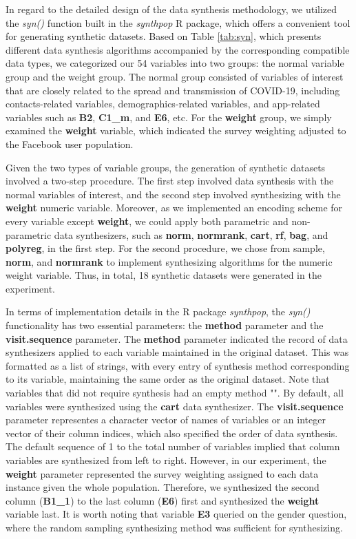 In regard to the detailed design of the data synthesis methodology, we utilized the \textit{syn()} function built in the \textit{synthpop} R package, which offers a convenient tool for generating synthetic datasets. Based on Table \ref{tab:syn}, which presents different data synthesis algorithms accompanied by the corresponding compatible data types, we categorized our 54 variables into two groups: the normal variable group and the weight group. The normal group consisted of variables of interest that are closely related to the spread and transmission of COVID-19, including contacts-related variables, demographics-related variables, and app-related variables such as \textbf{B2}, \textbf{C1\_m}, and \textbf{E6}, etc. For the \textbf{weight} group, we simply examined the \textbf{weight} variable, which indicated the survey weighting adjusted to the Facebook user population.

Given the two types of variable groups, the generation of synthetic datasets involved a two-step procedure. The first step involved data synthesis with the normal variables of interest, and the second step involved synthesizing with the \textbf{weight} numeric variable. Moreover, as we implemented an encoding scheme for every variable except \textbf{weight}, we could apply both parametric and non-parametric data synthesizers, such as \textbf{norm}, \textbf{normrank}, \textbf{cart}, \textbf{rf}, \textbf{bag}, and \textbf{polyreg}, in the first step. For the second procedure, we chose from sample, \textbf{norm}, and \textbf{normrank} to implement synthesizing algorithms for the numeric weight variable. Thus, in total, 18 synthetic datasets were generated in the experiment.

In terms of implementation details in the R package \textit{synthpop}, the \textit{syn()} functionality has two essential parameters: the \textbf{method} parameter and the \textbf{visit.sequence} parameter. The \textbf{method} parameter indicated the record of data synthesizers applied to each variable maintained in the original dataset. This was formatted as a list of strings, with every entry of synthesis method corresponding to its variable, maintaining the same order as the original dataset. Note that variables that did not require synthesis had an empty method "". By default, all variables were synthesized using the \textbf{cart} data synthesizer. The \textbf{visit.sequence} parameter representes a character vector of names of variables or an integer vector of their column indices, which also specified the order of data synthesis. The default sequence of 1 to the total number of variables implied that column variables are synthesized from left to right. However, in our experiment, the \textbf{weight} parameter represented the survey weighting assigned to each data instance given the whole population. Therefore, we synthesized the second column (\textbf{B1\_1}) to the last column (\textbf{E6}) first and synthesized the \textbf{weight} variable last. It is worth noting that variable \textbf{E3} queried on the gender question, where the random sampling synthesizing method was sufficient for synthesizing.

